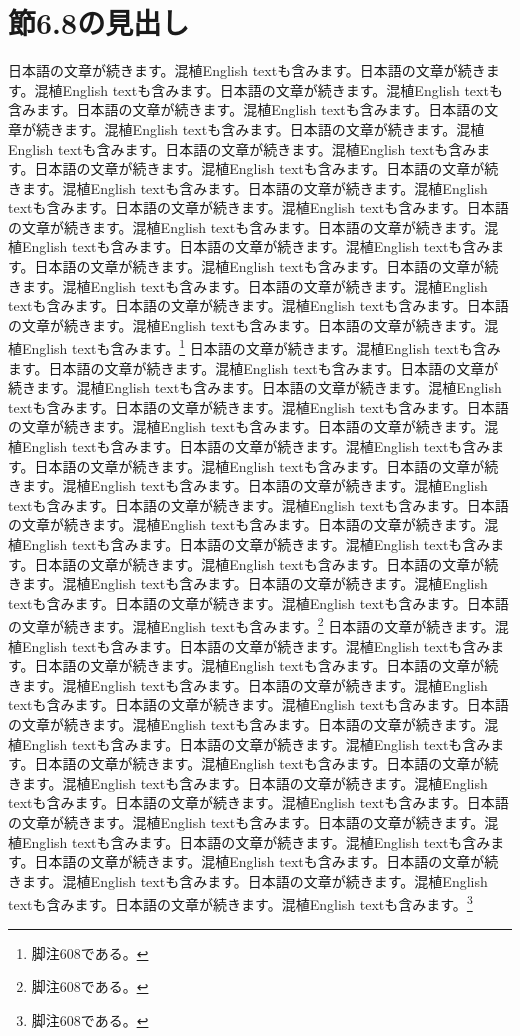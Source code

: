 \documentclass[pdflatex,book]{jlreq}
\begin{document}
\section{節6.8の見出し}
日本語の文章が続きます。混植English textも含みます。日本語の文章が続きます。混植English textも含みます。日本語の文章が続きます。混植English textも含みます。日本語の文章が続きます。混植English textも含みます。日本語の文章が続きます。混植English textも含みます。日本語の文章が続きます。混植English textも含みます。日本語の文章が続きます。混植English textも含みます。日本語の文章が続きます。混植English textも含みます。日本語の文章が続きます。混植English textも含みます。日本語の文章が続きます。混植English textも含みます。日本語の文章が続きます。混植English textも含みます。日本語の文章が続きます。混植English textも含みます。日本語の文章が続きます。混植English textも含みます。日本語の文章が続きます。混植English textも含みます。日本語の文章が続きます。混植English textも含みます。日本語の文章が続きます。混植English textも含みます。日本語の文章が続きます。混植English textも含みます。日本語の文章が続きます。混植English textも含みます。日本語の文章が続きます。混植English textも含みます。日本語の文章が続きます。混植English textも含みます。\footnote{脚注608である。}
日本語の文章が続きます。混植English textも含みます。日本語の文章が続きます。混植English textも含みます。日本語の文章が続きます。混植English textも含みます。日本語の文章が続きます。混植English textも含みます。日本語の文章が続きます。混植English textも含みます。日本語の文章が続きます。混植English textも含みます。日本語の文章が続きます。混植English textも含みます。日本語の文章が続きます。混植English textも含みます。日本語の文章が続きます。混植English textも含みます。日本語の文章が続きます。混植English textも含みます。日本語の文章が続きます。混植English textも含みます。日本語の文章が続きます。混植English textも含みます。日本語の文章が続きます。混植English textも含みます。日本語の文章が続きます。混植English textも含みます。日本語の文章が続きます。混植English textも含みます。日本語の文章が続きます。混植English textも含みます。日本語の文章が続きます。混植English textも含みます。日本語の文章が続きます。混植English textも含みます。日本語の文章が続きます。混植English textも含みます。日本語の文章が続きます。混植English textも含みます。\footnote{脚注608である。}
日本語の文章が続きます。混植English textも含みます。日本語の文章が続きます。混植English textも含みます。日本語の文章が続きます。混植English textも含みます。日本語の文章が続きます。混植English textも含みます。日本語の文章が続きます。混植English textも含みます。日本語の文章が続きます。混植English textも含みます。日本語の文章が続きます。混植English textも含みます。日本語の文章が続きます。混植English textも含みます。日本語の文章が続きます。混植English textも含みます。日本語の文章が続きます。混植English textも含みます。日本語の文章が続きます。混植English textも含みます。日本語の文章が続きます。混植English textも含みます。日本語の文章が続きます。混植English textも含みます。日本語の文章が続きます。混植English textも含みます。日本語の文章が続きます。混植English textも含みます。日本語の文章が続きます。混植English textも含みます。日本語の文章が続きます。混植English textも含みます。日本語の文章が続きます。混植English textも含みます。日本語の文章が続きます。混植English textも含みます。日本語の文章が続きます。混植English textも含みます。\footnote{脚注608である。}
\end{document}
